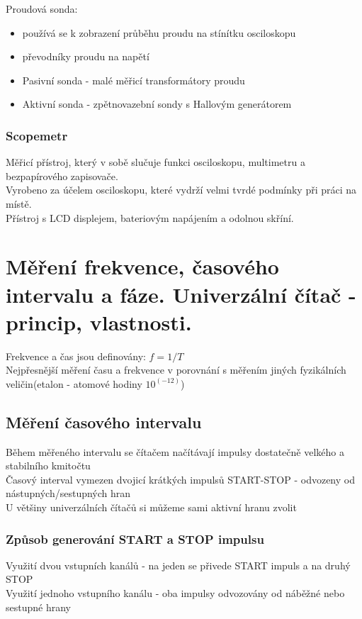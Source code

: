 Proudová sonda:
\begin{itemize}
    \item používá se k zobrazení průběhu proudu na stínítku osciloskopu
    \item převodníky proudu na napětí
    \item Pasivní sonda - malé měřicí transformátory proudu
    \item Aktivní sonda - zpětnovazební sondy s Hallovým generátorem
\end{itemize}

\subsubsection*{Scopemetr}
Měřicí přístroj, který v sobě slučuje funkci osciloskopu, multimetru a bezpapírového zapisovače.\\
Vyrobeno za účelem osciloskopu, které vydrží velmi tvrdé podmínky při práci na místě.\\
Přístroj s LCD displejem, bateriovým napájením a odolnou skříní.\\

\section{Měření frekvence, časového intervalu a fáze. Univerzální čítač - princip, vlastnosti.}
Frekvence a čas jsou definovány: $f = 1/T$\\ Nejpřesnější měření času a
frekvence v porovnání s měřením jiných fyzikálních veličin(etalon - atomové
hodiny $10^(-12)$)\\

\subsection*{Měření časového intervalu}
Během měřeného intervalu se čítačem načítávají impulsy dostatečně velkého a
stabilního kmitočtu\\ Časový interval vymezen dvojicí krátkých impulsů
START-STOP - odvozeny od nástupných/sestupných hran\\ U většiny univerzálních
čítačů si můžeme sami aktivní hranu zvolit\\

\subsubsection*{Způsob generování START a STOP impulsu}
Využití dvou vstupních kanálů - na jeden se přivede START impuls a na druhý STOP\\
Využití jednoho vstupního kanálu - oba impulsy odvozovány od náběžné nebo sestupné hrany


